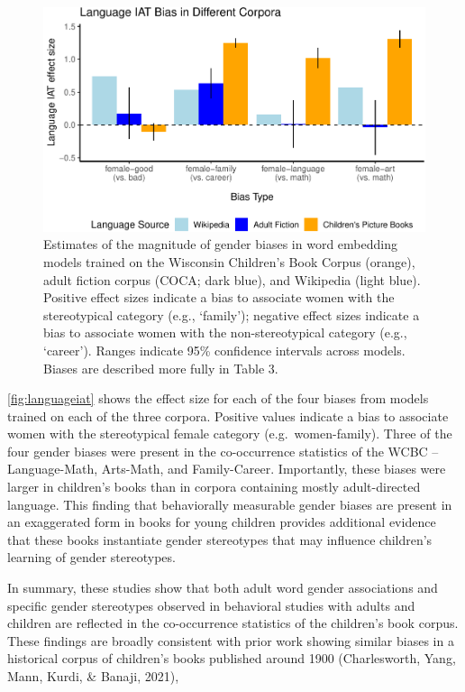 \documentclass[
  english,
  ,man,floatsintext]{apa6}
\begin{document}
\begin{figure}[t!]
\includegraphics[width=\textwidth,]{kidbookgender_psych_sci_files/figure-latex/languageiat-1} \caption{Estimates of the magnitude of gender biases in word embedding models trained on the Wisconsin Children’s Book Corpus (orange), adult fiction corpus (COCA; dark blue), and Wikipedia (light blue). Positive effect sizes indicate a bias to associate women with the stereotypical category (e.g., ‘family'); negative effect sizes indicate a bias to associate women with the non-stereotypical category (e.g., ‘career’).  Ranges indicate 95\% confidence intervals across models. Biases are described more fully in Table 3.}\label{fig:languageiat}
\end{figure}

\autoref{fig:languageiat} shows the effect size for each of the four biases from models trained on each of the three corpora. Positive values indicate a bias to associate women with the stereotypical female category (e.g.~women-family). Three of the four gender biases were present in the co-occurrence statistics of the WCBC -- Language-Math, Arts-Math, and Family-Career. Importantly, these biases were larger in children's books than in corpora containing mostly adult-directed language. This finding that behaviorally measurable gender biases are present in an exaggerated form in books for young children provides additional evidence that these books instantiate gender stereotypes that may influence children's learning of gender stereotypes.

In summary, these studies show that both adult word gender associations and specific gender stereotypes observed in behavioral studies with adults and children are reflected in the co-occurrence statistics of the children's book corpus. These findings are broadly consistent with prior work showing similar biases in a historical corpus of children's books published around 1900 (Charlesworth, Yang, Mann, Kurdi, \& Banaji, 2021),
\end{document}
